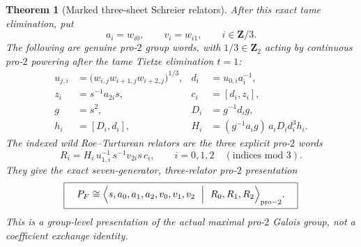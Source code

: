 \documentclass[11pt]{article}
\newtheorem{theorem}{Theorem}[section]
\theoremstyle{definition}
\begin{document}
\begin{theorem}[Marked three-sheet Schreier relators]
After this \emph{exact}
tame elimination, put
\[
a_i=w_{i0},\qquad
v_i=w_{i1},\qquad
i\in\mathbf Z/3.
\]
The following are genuine
pro-$2$ group words,
with $1/3\in\mathbf Z_2$
acting by continuous
pro-$2$ powering
\emph{after} the tame
Tietze elimination
$t=1$:
\begin{equation}\label{eq:dyadic-f133-u-and-d-words}
\boxed{
\begin{aligned}
u_{j,i}
 &=\bigl(w_{i,j}w_{i+1,j}
              w_{i+2,j}\bigr)^{1/3},
 & d_i&=u_{0,i}a_i^{-1},\\
z_i&=s^{-1}a_{2i}s,
 & c_i&=[d_i,z_i],\\
g&=s^2,&
D_i&=g^{-1}d_i g,\\
h_i&=[D_i,d_i],
 &H_i&=(g^{-1}a_i g)\,
       a_iD_i d_i^3h_i.
\end{aligned}}
\end{equation}
The indexed wild
Roe--Turturean relators
are the three explicit
pro-$2$ words
\begin{equation}\label{eq:dyadic-f133-three-wild-relators}
\boxed{\quad
R_i
=H_i\,u_{1,i}^{-1}\,
s^{-1}v_{2i}s\,c_i,
\qquad i=0,1,2
\quad(\text{indices mod }3).
\quad}
\end{equation}
They give the exact
seven-generator,
three-relator pro-$2$
presentation
\begin{equation}\label{eq:dyadic-f133-seven-three-presentation}
\boxed{\quad
P_F\cong
\Bigl\langle
s,a_0,a_1,a_2,v_0,v_1,v_2
\ \Bigm|\
R_0,R_1,R_2
\Bigr\rangle_{\mathrm{pro}-2}.
\quad}
\end{equation}
This is a \emph{group-level}
presentation of the actual
maximal pro-$2$ Galois
group, not a coefficient
exchange identity.
\end{theorem}
\end{document}
